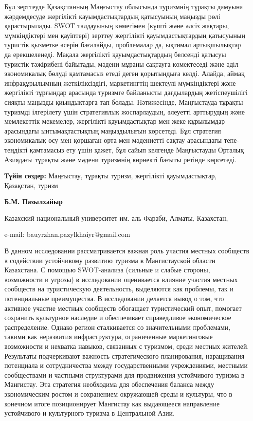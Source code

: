 Бұл зерттеуде Қазақстанның Маңғыстау облысында туризмнің тұрақты дамуына
жәрдемдесуде жергілікті қауымдастықтардың қатысуының маңызды рөлі
қарастырылады. SWOT талдауының көмегімен (күшті және әлсіз жақтары,
мүмкіндіктері мен қауіптері) зерттеу жергілікті қауымдастықтардың
қатысуының туристік қызметке әсерін бағалайды, проблемалар да, ықтимал
артықшылықтар да ерекшеленеді. Мақала жергілікті қауымдастықтардың
белсенді қатысуы туристік тәжірибені байытады, мәдени мұраны сақтауға
көмектеседі және әділ экономикалық бөлуді қамтамасыз етеді деген
қорытындыға келді. Алайда, аймақ инфрақұрылымның жеткіліксіздігі,
маркетингтің шектеулі мүмкіндіктері және жергілікті тұрғындар арасында
туризмге байланысты дағдылардың жетіспеушілігі сияқты маңызды
қиындықтарға тап болады. Нәтижесінде, Маңғыстауда тұрақты туризмді
ілгерілету үшін стратегиялық жоспарлаудың, әлеуетті арттырудың және
мемлекеттік мекемелер, жергілікті қауымдастықтар мен жеке құрылымдар
арасындағы ынтымақтастықтың маңыздылығын көрсетеді. Бұл стратегия
экономикалық өсу мен қоршаған орта мен мәдениетті сақтау арасындағы
тепе-теңдікті қамтамасыз ету үшін қажет, бұл сайып келгенде Маңғыстауды
Орталық Азиядағы тұрақты және мәдени туризмнің көрнекті бағыты ретінде
көрсетеді.

{\bfseries Түйін сөздер:} Маңғыстау, тұрақты туризм, жергілікті
қауымдастықтар, Қазақстан, туризм


\begin{center}
{\bfseries Б.М. Пазылхайыр}

Казахский национальный университет им. аль-Фараби, Алматы, Казахстан,

e-mail: bauyrzhan.pazylkhaiyr@gmail.com
\end{center}

В данном исследовании рассматривается важная роль участия местных
сообществ в содействии устойчивому развитию туризма в Мангистауской
области Казахстана. С помощью SWOT-анализа (сильные и слабые стороны,
возможности и угрозы) в исследовании оценивается влияние участия местных
сообществ на туристическую деятельность, выделяются как проблемы, так и
потенциальные преимущества. В исследовании делается вывод о том, что
активное участие местных сообществ обогащает туристический опыт,
помогает сохранить культурное наследие и обеспечивает справедливое
экономическое распределение. Однако регион сталкивается со значительными
проблемами, такими как неразвития инфраструктура, ограниченные
маркетинговые возможности и нехватка навыков, связанных с туризмом,
среди местных жителей. Результаты подчеркивают важность стратегического
планирования, наращивания потенциала и сотрудничества между
государственными учреждениями, местными сообществами и частными
структурами для продвижения устойчивого туризма в Мангистау. Эта
стратегия необходима для обеспечения баланса между экономическим ростом
и сохранением окружающей среды и культуры, что в конечном итоге
позиционирует Мангистау как выдающееся направление устойчивого и
культурного туризма в Центральной Азии.

